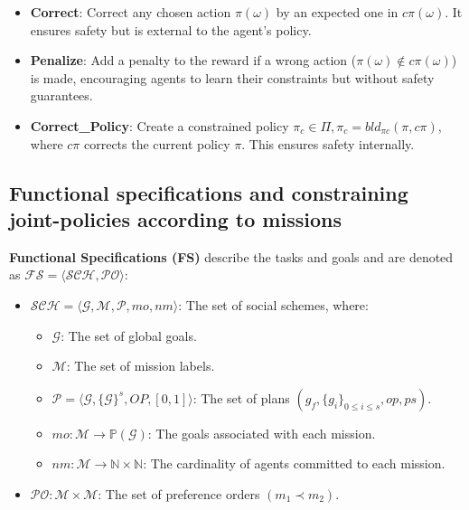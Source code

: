 \documentclass[conference]{IEEEtran}
\begin{document}
\begin{itemize}
    \item \textbf{Correct}: Correct any chosen action $\pi(\omega)$ by an expected one in $c\pi(\omega)$. It ensures safety but is external to the agent's policy.
    \item \textbf{Penalize}: Add a penalty to the reward if a wrong action ($\pi(\omega) \notin c\pi(\omega)$) is made, encouraging agents to learn their constraints but without safety guarantees.
    \item \textbf{Correct\_Policy}: Create a constrained policy $\pi_c \in \Pi, \pi_c = bld_{\pi c}(\pi, c\pi)$, where $c\pi$ corrects the current policy $\pi$. This ensures safety internally.
\end{itemize}



\subsection{Functional specifications and constraining joint-policies according to missions}

\textbf{Functional Specifications (FS)} describe the tasks and goals and are denoted as $\mathcal{FS} = \langle \mathcal{SCH}, \mathcal{PO} \rangle$:

\begin{itemize}
    \item $\mathcal{SCH} = \langle \mathcal{G}, \mathcal{M}, \mathcal{P}, mo, nm \rangle$: The set of social schemes, where:
          \begin{itemize}
              \item $\mathcal{G}$: The set of global goals.
              \item $\mathcal{M}$: The set of mission labels.
              \item $\mathcal{P} = \langle \mathcal{G}, \{\mathcal{G}\}^s, OP, [0,1] \rangle$: The set of plans $(g_f, \{g_i\}_{0 \leq i \leq s}, op, ps)$.
              \item $mo: \mathcal{M} \rightarrow \mathbb{P}(\mathcal{G})$: The goals associated with each mission.
              \item $nm: \mathcal{M} \rightarrow \mathbb{N} \times \mathbb{N}$: The cardinality of agents committed to each mission.
          \end{itemize}
    \item $\mathcal{PO}: \mathcal{M} \times \mathcal{M}$: The set of preference orders $(m_1 \prec m_2)$.
\end{itemize}
\end{document}
